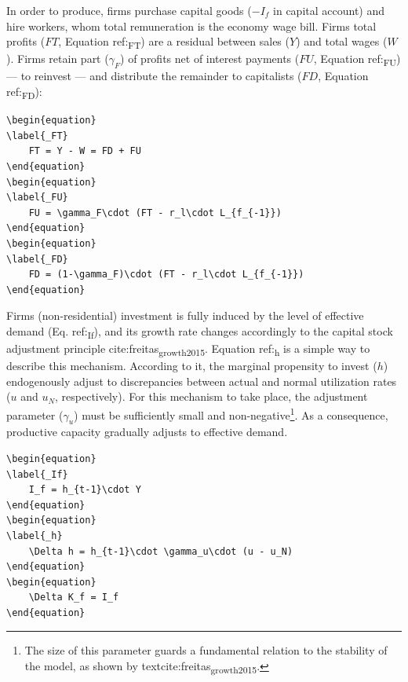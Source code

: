 \documentclass[12pt]{article}
\begin{document}
In order to produce, firms purchase capital goods (\(-I_f\) in capital account) and hire workers, whom total remuneration is the economy wage bill. 
Firms total profits (\(FT\), Equation ref:\textsubscript{FT}) are a residual between sales (\(Y\)) and total wages (\(W\)).
Firms retain part (\(\gamma_F\)) of profits net of interest payments (\(FU\), Equation ref:\textsubscript{FU}) --- to reinvest --- and distribute the remainder to capitalists (\(FD\), Equation ref:\textsubscript{FD}):

\begin{verbatim}
\begin{equation}
\label{_FT}
    FT = Y - W = FD + FU
\end{equation}
\begin{equation}
\label{_FU}
    FU = \gamma_F\cdot (FT - r_l\cdot L_{f_{-1}})
\end{equation}
\begin{equation}
\label{_FD}
    FD = (1-\gamma_F)\cdot (FT - r_l\cdot L_{f_{-1}})
\end{equation}
\end{verbatim}

Firms (non-residential) investment is fully induced by the level of effective demand (Eq. ref:\textsubscript{If}), and its growth rate changes accordingly to the capital stock adjustment principle cite:freitas\textsubscript{growth}\textsubscript{2015}.
Equation ref:\textsubscript{h} is a simple way to describe this mechanism.
According to it, the marginal propensity to invest (\(h\)) endogenously adjust to discrepancies between actual and normal utilization rates (\(u\) and \(u_N\), respectively). 
For this mechanism to take place, the adjustment parameter (\(\gamma_u\)) must be sufficiently small and non-negative\footnote{The size of this parameter guards a fundamental relation to the stability of the model, as shown by textcite:freitas\textsubscript{growth}\textsubscript{2015}.}. 
As a consequence, productive capacity gradually adjusts to effective demand.

\begin{verbatim}
\begin{equation}
\label{_If}
    I_f = h_{t-1}\cdot Y
\end{equation}
\begin{equation}
\label{_h}
    \Delta h = h_{t-1}\cdot \gamma_u\cdot (u - u_N)
\end{equation}
\begin{equation}
    \Delta K_f = I_f
\end{equation}
\end{verbatim}
\end{document}
